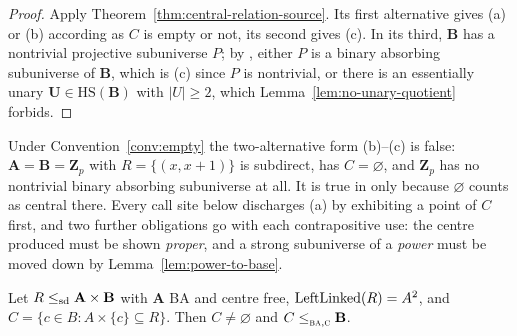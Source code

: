 \begin{proof}
Apply Theorem~\ref{thm:central-relation-source}. Its first alternative gives
(a) or (b) according as $C$ is empty or not, its second gives (c). In its third,
$\mathbf B$ has a nontrivial projective subuniverse $P$; by
\cite[Lem.~3.4]{ZhukStrong}, either $P$ is a binary absorbing subuniverse of
$\mathbf B$, which is (c) since $P$ is nontrivial, or there is an essentially
unary $\mathbf U\in\mathrm{HS}(\mathbf B)$ with $|U|\ge2$, which
Lemma~\ref{lem:no-unary-quotient} forbids.
\end{proof}

\begin{hazard}\label{haz:central-relation}
Under Convention~\ref{conv:empty} the two-alternative form (b)--(c) is false:
$\mathbf A=\mathbf B=\mathbf Z_{p}$ with $R=\{(x,x+1)\}$ is subdirect, has
$C=\varnothing$, and $\mathbf Z_{p}$ has no nontrivial binary absorbing
subuniverse at all. It is true in \cite{ZhukStrong} only because $\varnothing$
counts as central there. Every call site below discharges (a) by exhibiting a
point of $C$ first, and two further obligations go with each contrapositive
use: the centre produced must be shown \emph{proper}, and a strong subuniverse
of a \emph{power} must be moved down by Lemma~\ref{lem:power-to-base}.
\end{hazard}

\begin{lemma}\label{lem:bacon-left}
Let $R\le_{\mathrm{sd}}\mathbf A\times\mathbf B$ with $\mathbf A$ BA and centre free,
$\operatorname{LeftLinked}(R)=A^{2}$, and
$C=\{c\in B:A\times\{c\}\subseteq R\}$. Then $C\neq\varnothing$ and
$C\le_{\textup{\textsc{ba}},\textup{\textsc{c}}}^{}\mathbf B$.
\end{lemma}

